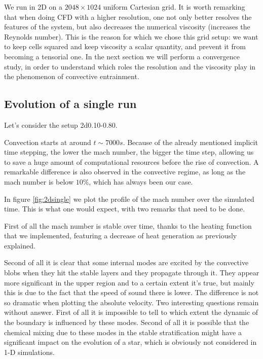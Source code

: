 We run in 2D on a $2048 \times 1024$ uniform Cartesian grid. It is worth remarking that when doing CFD with a higher resolution, one not only better resolves the features of the system, but also decreases the numerical viscosity (increases the Reynolds number). This is the reason for which we chose this grid setup: we want to keep cells squared and keep viscosity a scalar quantity, and prevent it from becoming a tensorial one. In the next section we will perform a convergence study, in order to understand which roles the resolution and the viscosity play in the phenomenon of convective entrainment.


\subsection{Evolution of a single run}




Let's consider the setup 2d0.10-0.80. 

Convection starts at around $t \sim 7000 s$. Because of the already mentioned implicit time stepping, the lower the mach number, the bigger the time step, allowing us to save a huge amount of computational resources before the rise of convection. A remarkable difference is also observed in the convective regime, as long as the mach number is below $10 \%$, which has always been our case.

In figure \ref{fig:2dsingle} we plot the profile of the mach number over the simulated time. This is what one would expect, with two remarks that need to be done. 

First of all the mach number is stable over time, thanks to the heating function that we implemented, featuring a decrease of heat generation as previously explained. 

Second of all it is clear that some internal modes are excited by the convective blobs when they hit the stable layers and they propagate through it. They appear more significant in the upper region and to a certain extent it's true, but mainly this is due to the fact that the speed of sound there is lower. The difference is not so dramatic when plotting the absolute velocity. Two interesting questions remain without answer. First of all it is impossible to tell to which extent the dynamic of the boundary is influenced by these modes. Second of all it is possible that the chemical mixing due to these modes in the stable stratification might have a significant impact on the evolution of a star, which is obviously not considered in 1-D simulations.

